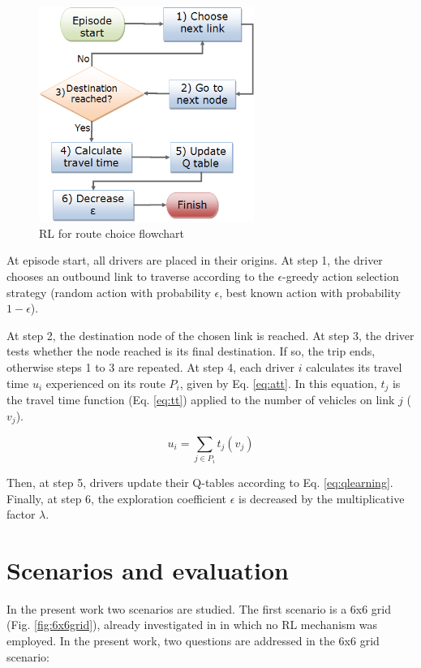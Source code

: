 \documentclass{RITA}
\newcommand{\route}[1]{\ensuremath{P_#1}}	%
\newcommand{\travTime}{\ensuremath{t_j}} 	%
\newcommand{\veh}{\ensuremath{v}}		%
\newcommand{\att}[1]{\ensuremath{u_#1}}		%
\begin{document}
\begin{figure}[ht]
    \centerline{\includegraphics[width=7cm]{img/flowchart3.png}}
    \caption{RL for route choice flowchart}
    \label{fig:flowchart}
\end{figure}

At episode start, all drivers are placed in their origins. At step 1, the driver chooses an outbound link to traverse according to the $\epsilon$-greedy action selection strategy (random action with probability $\epsilon$, best known action with probability $1 - \epsilon$). %

At step 2, the destination node of the chosen link is reached. At step 3, the driver tests whether the node reached is its final destination. If so, the trip ends, otherwise steps 1 to 3 are repeated. At step 4, each driver $i$ calculates its travel time $\att{i}$ experienced on its route $\route{i}$, given by Eq. \eqref{eq:att}. In this equation, $\travTime$ is the travel time function (Eq. \eqref{eq:tt}) applied to the number of vehicles on link $j$ ($\veh_j$).

\begin{equation}
\label{eq:att}
\att{i} = \sum_{j \in \route{i}} \travTime(\veh_j)
\end{equation}

Then, at step 5, drivers update their Q-tables according to Eq. \eqref{eq:qlearning}. Finally, at step 6, the exploration coefficient $\epsilon$ is decreased by the multiplicative factor $\lambda$.

\section{Scenarios and evaluation}
\label{sec:scenario}
In the present work two scenarios are studied. The first scenario is a 6x6 grid (Fig. \ref{fig:6x6grid}), already investigated in \cite{Bazzan+2007alamas,Bazzan+2007alag,Bazzan+2008alamas} in which no RL mechanism was employed. In the present work, two questions are addressed in the 6x6 grid scenario:
\end{document}
